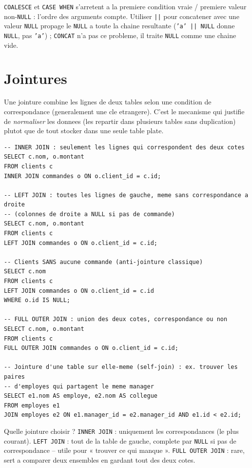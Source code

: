 \documentclass[11pt,a4paper]{article}
\begin{document}
\begin{piege}
\texttt{COALESCE} et \texttt{CASE WHEN} s'arretent a la premiere condition
vraie / premiere valeur non-\texttt{NULL} : l'ordre des arguments compte.
Utiliser \texttt{||} pour concatener avec une valeur \texttt{NULL} propage le
\texttt{NULL} a toute la chaine resultante (\texttt{'a' || NULL} donne
\texttt{NULL}, pas \texttt{'a'}) ; \texttt{CONCAT} n'a pas ce probleme, il
traite \texttt{NULL} comme une chaine vide.
\end{piege}

\section{Jointures}
Une jointure combine les lignes de deux tables selon une condition de
correspondance (generalement une cle etrangere). C'est le mecanisme qui
justifie de \emph{normaliser} les donnees (les repartir dans plusieurs tables
sans duplication) plutot que de tout stocker dans une seule table plate.

\begin{lstlisting}
-- INNER JOIN : seulement les lignes qui correspondent des deux cotes
SELECT c.nom, o.montant
FROM clients c
INNER JOIN commandes o ON o.client_id = c.id;

-- LEFT JOIN : toutes les lignes de gauche, meme sans correspondance a droite
-- (colonnes de droite a NULL si pas de commande)
SELECT c.nom, o.montant
FROM clients c
LEFT JOIN commandes o ON o.client_id = c.id;

-- Clients SANS aucune commande (anti-jointure classique)
SELECT c.nom
FROM clients c
LEFT JOIN commandes o ON o.client_id = c.id
WHERE o.id IS NULL;

-- FULL OUTER JOIN : union des deux cotes, correspondance ou non
SELECT c.nom, o.montant
FROM clients c
FULL OUTER JOIN commandes o ON o.client_id = c.id;

-- Jointure d'une table sur elle-meme (self-join) : ex. trouver les paires
-- d'employes qui partagent le meme manager
SELECT e1.nom AS employe, e2.nom AS collegue
FROM employes e1
JOIN employes e2 ON e1.manager_id = e2.manager_id AND e1.id < e2.id;
\end{lstlisting}

\begin{infobox}{Quelle jointure choisir ?}
\texttt{INNER JOIN} : uniquement les correspondances (le plus courant).
\texttt{LEFT JOIN} : tout de la table de gauche, complete par \texttt{NULL} si
pas de correspondance -- utile pour « trouver ce qui manque ». \texttt{FULL
OUTER JOIN} : rare, sert a comparer deux ensembles en gardant tout des deux
cotes.
\end{infobox}
\end{document}
